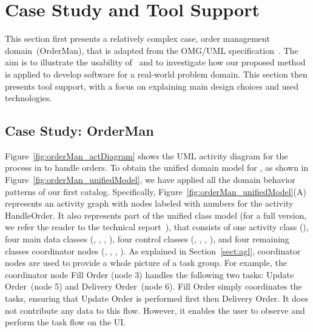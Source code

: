 \section{Case Study and Tool Support}
\label{sect:caseStudyToolSupport} %

This section first presents a relatively complex case, order management domain~(OrderMan), that is adapted from the OMG/UML specification~\cite[p.~396]{omg_unified_2017}. The aim is to illustrate the usability of \agl~and to investigate how our proposed method is applied to develop software for a real-world problem domain. This section then presents tool support, with a focus on explaining main design choices and used technologies.

\subsection{Case Study: OrderMan}
\label{subsect:caseStudy} %

Figure~\ref{fig:orderMan_actDiagram} shows the UML activity diagram for the process in \orderman to handle orders. To obtain the unified domain model for \orderman, as shown in Figure~\ref{fig:orderMan_unifiedModel}, we have applied 
all the domain behavior patterns of our first catalog. Specifically, Figure~\ref{fig:orderMan_unifiedModel}(A) represents an activity graph with nodes labeled with numbers for the activity HandleOrder. It also represents part of the unified class model (for a full version, we refer the reader to the technical report~\cite{dang2023aglTechReport}), that consists of one activity class (), four main data classes (, , , ), four control classes (, , , ), and four remaining classes \wrt coordinator nodes (, , , ). As explained in Section~\ref{sect:agl}, coordinator nodes are used to provide a whole picture of a task group. %
For example, the coordinator node Fill Order (node 3) handles the following two tasks: Update Order~(node 5) and Delivery Order~(node 6). %
Fill Order simply coordinates the tasks, ensuring that Update Order is performed first then Delivery Order. It does not contribute any data to this flow. However, it enables the user to observe and perform the task flow on the UI.


